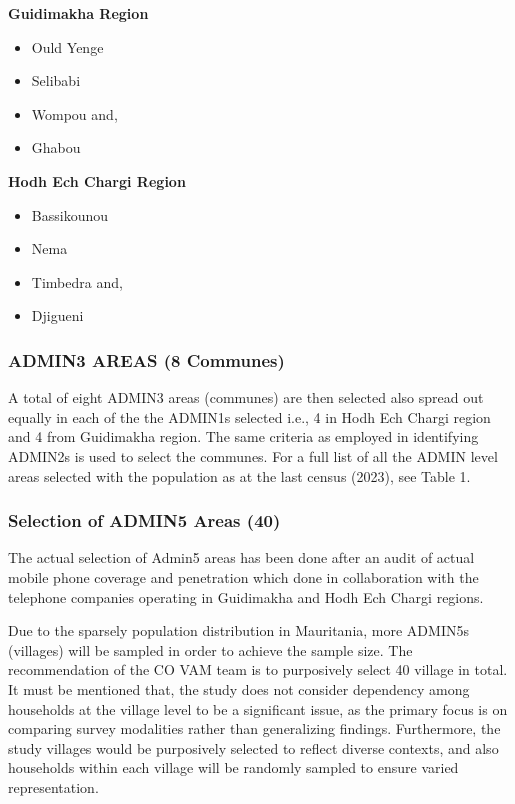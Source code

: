 \documentclass[11pt,harvard]{article}
\begin{document}
\textbf{Guidimakha Region}
	\begin{itemize}[left=2.0em]
		\item[1.]Ould Yenge
		\item[2.]Selibabi 
		\item[3.]Wompou	and, 
		\item[4.]Ghabou
	\end{itemize}
\textbf{Hodh Ech Chargi Region}
	\begin{itemize}[left=2.0em]
		\item[1.]Bassikounou 
		\item[2.]Nema  
		\item[3.]Timbedra and, 
		\item[4.]Djigueni 
	\end{itemize}
	
	
	\subsubsection{ADMIN3 AREAS (8 Communes)}
	A total of eight ADMIN3 areas (communes) are then selected also spread out equally in each of the the ADMIN1s  selected i.e., 4 in Hodh Ech Chargi region and 4 from Guidimakha region. The same criteria as employed in identifying ADMIN2s is used to select the communes. For a full list of all the ADMIN level areas selected with the population as at the last census (2023), see Table 1.
	
	\subsubsection{Selection of ADMIN5 Areas (40)}
	
	The actual selection of Admin5 areas has been done after an audit of actual mobile phone coverage and penetration which done in collaboration with the telephone companies operating in Guidimakha and Hodh Ech Chargi regions.
	
	Due to the sparsely population distribution in Mauritania, more ADMIN5s (villages) will be sampled in order to achieve the sample size. The recommendation of the CO VAM team is to purposively select 40 village in total. 
	It must be mentioned that, the study does not consider dependency among households at the village level to be a significant issue, as the primary focus is on comparing survey modalities rather than generalizing findings. Furthermore, the study villages would be purposively selected to reflect diverse contexts, and also households within each village will be randomly sampled to ensure varied representation.
\end{document}

